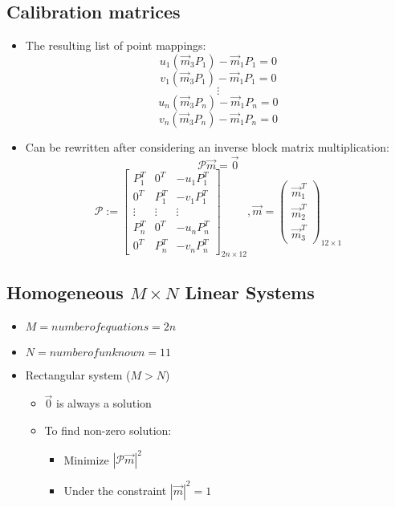 \subsection{Calibration matrices}
\begin{itemize}
	\item The resulting list of point mappings:
	$$u_1 (\vec{m}_3 P_1)-\vec{m}_1 P_1 = 0$$
	$$v_1 (\vec{m}_3 P_1)-\vec{m}_1 P_1 = 0$$
	$$\vdots$$
	$$u_n (\vec{m}_3 P_n)-\vec{m}_1 P_n = 0$$
	$$v_n (\vec{m}_3 P_n)-\vec{m}_1 P_n = 0$$
	\item Can be rewritten after considering an inverse block matrix multiplication:
	$$\mathcal{P}\vec{m}=\vec{0}$$
	$$\mathcal{P}:=\begin{bmatrix}
		P_1^T & 0^T & -u_1 P_1^T \\
		0^T & P_1^T & -v_1 P_1^T \\
		\vdots & \vdots & \vdots \\
		P_n^T & 0^T & -u_n P_n^T \\
		0^T & P_n^T & -v_n P_n^T
	\end{bmatrix}_{2n\times 12}, \vec{m}=\begin{pmatrix}
		\vec{m}^T_1 \\ \vec{m}^T_2 \\ \vec{m}^T_3
	\end{pmatrix}_{12\times 1}$$
\end{itemize}

\subsection{Homogeneous $M\times N$ Linear Systems}
\begin{itemize}
	\item $M= number of equations = 2n$
	\item $N = number of unknown = 11$
	\item Rectangular system ($M>N$)
	\begin{itemize}
		\item $\vec{0}$ is always a solution
		\item To find non-zero solution:
		\begin{itemize}
			\item Minimize $|\mathcal{P}\vec{m}|^2$
			\item Under the constraint $|\vec{m}|^2=1$
		\end{itemize}
	\end{itemize}
\end{itemize}


